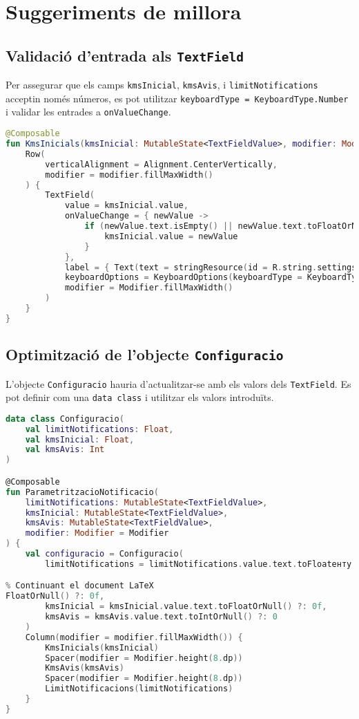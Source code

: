 \documentclass[a4paper,12pt]{article}
\begin{document}
\section{Suggeriments de millora}

\subsection{Validació d'entrada als \texttt{TextField}}
Per assegurar que els camps \texttt{kmsInicial}, \texttt{kmsAvis}, i \texttt{limitNotifications} acceptin només números, es pot utilitzar \texttt{keyboardType = KeyboardType.Number} i validar les entrades a \texttt{onValueChange}.

\begin{lstlisting}[language=Kotlin]
@Composable
fun KmsInicials(kmsInicial: MutableState<TextFieldValue>, modifier: Modifier = Modifier) {
    Row(
        verticalAlignment = Alignment.CenterVertically,
        modifier = modifier.fillMaxWidth()
    ) {
        TextField(
            value = kmsInicial.value,
            onValueChange = { newValue ->
                if (newValue.text.isEmpty() || newValue.text.toFloatOrNull() != null) {
                    kmsInicial.value = newValue
                }
            },
            label = { Text(text = stringResource(id = R.string.settings_km_start)) },
            keyboardOptions = KeyboardOptions(keyboardType = KeyboardType.Number),
            modifier = Modifier.fillMaxWidth()
        )
    }
}
\end{lstlisting}

\subsection{Optimització de l'objecte \texttt{Configuracio}}
L'objecte \texttt{Configuracio} hauria d'actualitzar-se amb els valors dels \texttt{TextField}. Es pot definir com una \texttt{data class} i utilitzar els valors introduïts.

\begin{lstlisting}[language=Kotlin]
data class Configuracio(
    val limitNotifications: Float,
    val kmsInicial: Float,
    val kmsAvis: Int
)

@Composable
fun ParametritzacioNotificacio(
    limitNotifications: MutableState<TextFieldValue>,
    kmsInicial: MutableState<TextFieldValue>,
    kmsAvis: MutableState<TextFieldValue>,
    modifier: Modifier = Modifier
) {
    val configuracio = Configuracio(
        limitNotifications = limitNotifications.value.text.toFloatенту

% Continuant el document LaTeX
FloatOrNull() ?: 0f,
        kmsInicial = kmsInicial.value.text.toFloatOrNull() ?: 0f,
        kmsAvis = kmsAvis.value.text.toIntOrNull() ?: 0
    )
    Column(modifier = modifier.fillMaxWidth()) {
        KmsInicials(kmsInicial)
        Spacer(modifier = Modifier.height(8.dp))
        KmsAvis(kmsAvis)
        Spacer(modifier = Modifier.height(8.dp))
        LimitNotificacions(limitNotifications)
    }
}
\end{lstlisting}
\end{document}
